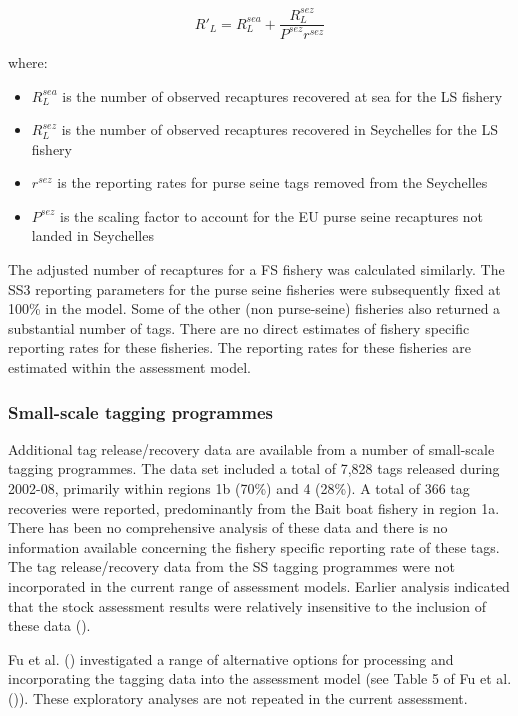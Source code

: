 \documentclass[
]{scrartcl}
\providecommand{\tightlist}{%
  \setlength{\itemsep}{0pt}\setlength{\parskip}{0pt}}\usepackage{longtable,booktabs,array}
\begin{document}
\[R'_L = R_L^{sea} + \frac{R_L^{sez}}{P^{sez}r^{sez}}\]

where:

\begin{itemize}
\tightlist
\item
  \(R_L^{sea}\) is the number of observed recaptures recovered at sea
  for the LS fishery
\item
  \(R_L^{sez}\) is the number of observed recaptures recovered in
  Seychelles for the LS fishery
\item
  \(r^{sez}\) is the reporting rates for purse seine tags removed from
  the Seychelles
\item
  \(P^{sez}\) is the scaling factor to account for the EU purse seine
  recaptures not landed in Seychelles
\end{itemize}

The adjusted number of recaptures for a FS fishery was calculated
similarly. The SS3 reporting parameters for the purse seine fisheries
were subsequently fixed at 100\% in the model. Some of the other (non
purse-seine) fisheries also returned a substantial number of tags. There
are no direct estimates of fishery specific reporting rates for these
fisheries. The reporting rates for these fisheries are estimated within
the assessment model.

\subsubsection{Small-scale tagging
programmes}\label{small-scale-tagging-programmes}

Additional tag release/recovery data are available from a number of
small-scale tagging programmes. The data set included a total of 7,828
tags released during 2002-08, primarily within regions 1b (70\%) and 4
(28\%). A total of 366 tag recoveries were reported, predominantly from
the Bait boat fishery in region 1a. There has been no comprehensive
analysis of these data and there is no information available concerning
the fishery specific reporting rate of these tags. The tag
release/recovery data from the SS tagging programmes were not
incorporated in the current range of assessment models. Earlier analysis
indicated that the stock assessment results were relatively insensitive
to the inclusion of these data
().

Fu et al. ()
investigated a range of alternative options for processing and
incorporating the tagging data into the assessment model (see Table 5 of
Fu et al. ()). These
exploratory analyses are not repeated in the current assessment.
\end{document}
